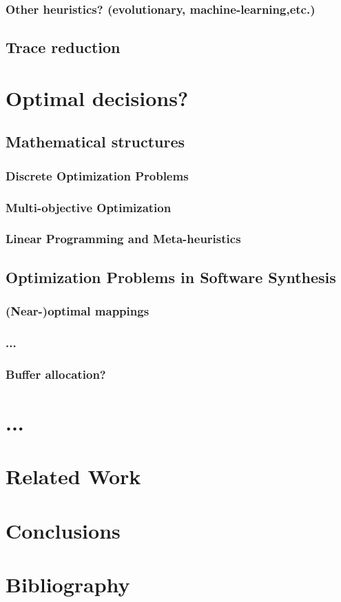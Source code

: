 \documentclass{article}
\begin{document}
\subsubsection{Other heuristics? (evolutionary, machine-learning,etc.)}
\subsection{Trace reduction}
\section{Optimal decisions?}
\subsection{Mathematical structures}
\subsubsection{Discrete Optimization Problems}
\subsubsection{Multi-objective Optimization}
\subsubsection{Linear Programming and Meta-heuristics}
\subsection{Optimization Problems in Software Synthesis}
\subsubsection{(Near-)optimal mappings}
\subsubsection{...}
\subsubsection{Buffer allocation?}
\section{...}
\section{Related Work}
\section{Conclusions} 
\section{Bibliography} 
\end{document}
